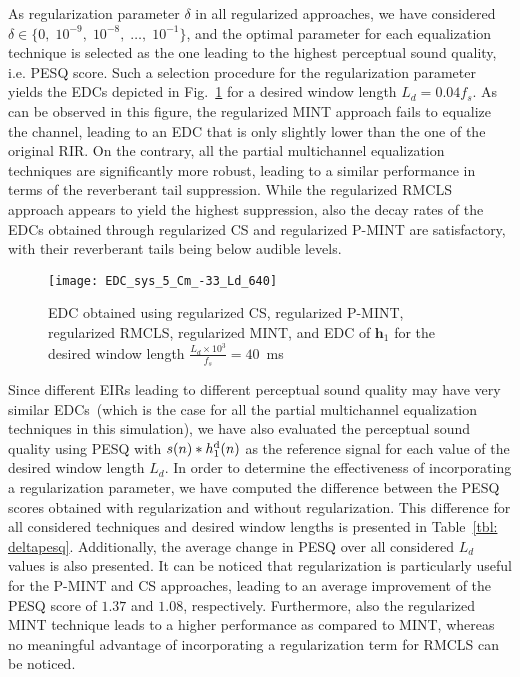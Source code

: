 \documentclass{article}
\begin{document}
As regularization parameter $\delta$ in all regularized approaches, we have considered $ \delta \in \{0, \; 10^{-9}, \;10^{-8}, \;  \ldots, \; 10^{-1} \}$,
and the optimal parameter for each equalization technique is selected as the one leading to the highest perceptual sound quality, i.e. PESQ score. 
Such a selection procedure for the regularization parameter yields the EDCs depicted in Fig.~\ref{fig: EDCs} for a desired window length $L_d = 0.04 f_s$. 
As can be observed in this figure, the regularized MINT approach fails to equalize the channel, leading to an EDC that is only slightly lower than the one of the original RIR. 
On the contrary, all the partial multichannel equalization techniques are significantly more robust, leading to a similar performance in terms of the reverberant tail suppression. 
While the regularized RMCLS approach appears to yield the highest suppression, also the decay rates of the EDCs obtained through regularized CS and regularized P-MINT are satisfactory, with their reverberant tails being below audible levels. 

\begin{figure}[t!]
\centering
\texttt{[image: EDC\_sys\_5\_Cm\_-33\_Ld\_640]}
\vspace{-0.8cm}
\caption{EDC obtained using regularized CS, regularized P-MINT, regularized RMCLS, regularized MINT, and EDC of $\mathbf{h}_1$ for the desired window length $\frac{L_d \times 10^{3}}{f_s} = 40$~ms}
\vspace{-0.5cm}
\label{fig: EDCs}
\end{figure}
Since different EIRs leading to different perceptual sound quality may have very similar EDCs~(which is the case for all the partial multichannel equalization techniques in this simulation), we have also evaluated the perceptual sound quality using PESQ with $s(n) \ast h_1^{\rm d}(n)$ as the reference signal for each value of the desired window length $L_d$.
In order to determine the effectiveness of incorporating a regularization parameter, we have computed the difference between the PESQ scores obtained with regularization and without regularization.
This difference for all considered techniques and desired window lengths is presented in Table~\ref{tbl: deltapesq}.
Additionally, the average change in PESQ over all considered $L_d$ values is also presented.
It can be noticed that regularization is particularly useful for the P-MINT and CS approaches, leading to an average improvement of the PESQ score of $1.37$ and $1.08$, respectively.
Furthermore, also the regularized MINT technique leads to a higher performance as compared to MINT, whereas no meaningful advantage of incorporating a regularization term for RMCLS can be noticed.
\end{document}
